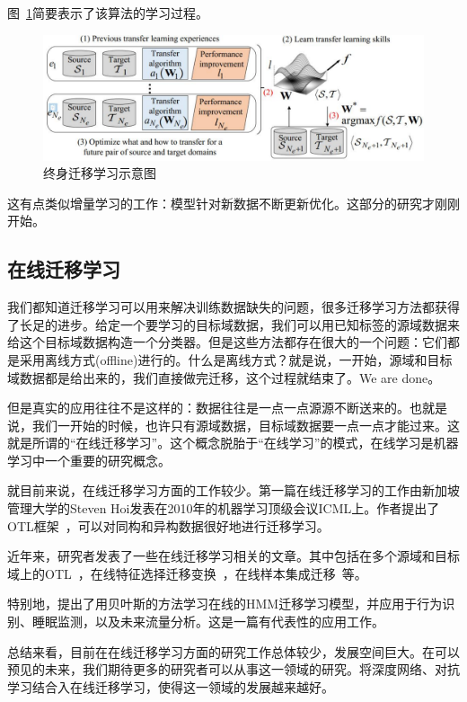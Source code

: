 图~\ref{fig-future-l2t}简要表示了该算法的学习过程。

\begin{figure}[htbp]
	\centering
	\includegraphics[scale=0.35]{./figures/fig-future-l2t.pdf}
	\caption{终身迁移学习示意图}
	\label{fig-future-l2t}
\end{figure}

这有点类似增量学习的工作：模型针对新数据不断更新优化。这部分的研究才刚刚开始。

\subsection{在线迁移学习}

我们都知道迁移学习可以用来解决训练数据缺失的问题，很多迁移学习方法都获得了长足的进步。给定一个要学习的目标域数据，我们可以用已知标签的源域数据来给这个目标域数据构造一个分类器。但是这些方法都存在很大的一个问题：它们都是采用离线方式(offline)进行的。什么是离线方式？就是说，一开始，源域和目标域数据都是给出来的，我们直接做完迁移，这个过程就结束了。We are done。

但是真实的应用往往不是这样的：数据往往是一点一点源源不断送来的。也就是说，我们一开始的时候，也许只有源域数据，目标域数据要一点一点才能过来。这就是所谓的“在线迁移学习”。这个概念脱胎于“在线学习”的模式，在线学习是机器学习中一个重要的研究概念。

就目前来说，在线迁移学习方面的工作较少。第一篇在线迁移学习的工作由新加坡管理大学的Steven Hoi发表在2010年的机器学习顶级会议ICML上。作者提出了OTL框架~\cite{zhao2010otl}，可以对同构和异构数据很好地进行迁移学习。

近年来，研究者发表了一些在线迁移学习相关的文章。其中包括在多个源域和目标域上的OTL~\cite{wu2017online,yan2017online}，在线特征选择迁移变换~\cite{wang2014online,zhang2017online}，在线样本集成迁移~\cite{gao2012online,patilknowledge}等。

特别地，\cite{jaini2016online}提出了用贝叶斯的方法学习在线的HMM迁移学习模型，并应用于行为识别、睡眠监测，以及未来流量分析。这是一篇有代表性的应用工作。

总结来看，目前在在线迁移学习方面的研究工作总体较少，发展空间巨大。在可以预见的未来，我们期待更多的研究者可以从事这一领域的研究。将深度网络、对抗学习结合入在线迁移学习，使得这一领域的发展越来越好。

